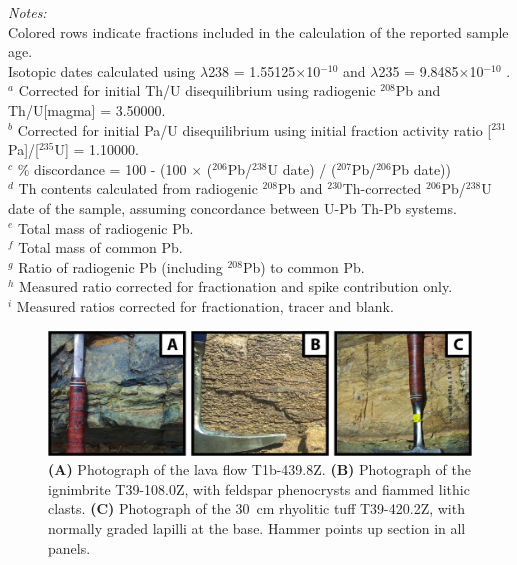 \documentclass[11pt,letterpaper]{article}
\begin{document}
\begin{table}
\flushleft \emph{Notes:} \\
Colored rows indicate fractions included in the calculation of the reported sample age. \\
Isotopic dates calculated using $\lambda$238 = 1.55125$\times$10$^{-10}$ and $\lambda$235 = 9.8485$\times$10$^{-10}$ \citep{Jaffey1971a}. \\
 $^{a}$  Corrected for initial Th/U disequilibrium using radiogenic $^{208}$Pb and Th/U[magma] = 3.50000. \\
 $^{b}$ Corrected for initial Pa/U disequilibrium using initial fraction activity ratio [$^{231}$Pa]/[$^{235}$U] = 1.10000. \\
 $^{c}$ \% discordance = 100 - (100 $\times$ ($^{206}$Pb/$^{238}$U date) / ($^{207}$Pb/$^{206}$Pb date)) \\
 $^{d}$ Th contents calculated from radiogenic $^{208}$Pb and $^{230}$Th-corrected $^{206}$Pb/$^{238}$U date of the sample, assuming concordance between U-Pb Th-Pb systems. \\
 $^{e}$ Total mass of radiogenic Pb. \\
 $^{f}$ Total mass of common Pb. \\
 $^{g}$ Ratio of radiogenic Pb (including $^{208}$Pb) to common Pb. \\
 $^{h}$ Measured ratio corrected for fractionation and spike contribution only. \\
 $^{i}$ Measured ratios corrected for fractionation, tracer and blank.
\end{table}

\begin{figure}[h!]
\begin{center}
	\includegraphics[width=\textwidth]{Figures/Geochronology_Photos.jpg}
	\caption{\textbf{(A)} Photograph of the lava flow T1b-439.8Z. \textbf{(B)} Photograph of the ignimbrite T39-108.0Z, with feldspar phenocrysts and fiammed lithic clasts. \textbf{(C)} Photograph of the 30~cm rhyolitic tuff T39-420.2Z, with normally graded lapilli at the base. Hammer points up section in all panels.}
	\label{fig:Geochronology_Photos}
\end{center}
\end{figure}
\end{document}
